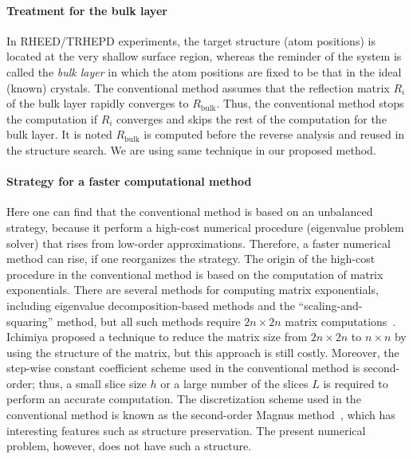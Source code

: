 \documentclass[preprint, 5p, times, sort&compress]{elsarticle}
\begin{document}
        \paragraph{Treatment for the bulk layer}
        In RHEED/TRHEPD experiments, the target structure (atom positions) is located at the very shallow surface region, whereas
        the reminder of the system is called the \emph{bulk layer} in which the atom positions are fixed to be that in the ideal (known) crystals.
        The conventional method assumes that the reflection matrix $R_i$ of the bulk layer rapidly converges to $R_\mathrm{bulk}$.
        Thus, the conventional method stops the computation if $R_i$ converges
        and skips the rest of the computation for the bulk layer. It is noted $R_\mathrm{bulk}$ is computed before the reverse analysis and reused in the structure search.
        We are using same technique in our proposed method.

        \paragraph{Strategy for a faster computational method}
        Here one can find that the conventional method is based on an unbalanced strategy, because it perform a high-cost numerical procedure (eigenvalue problem solver) that rises from  
        low-order approximations. Therefore, a faster numerical method can rise, if one reorganizes the strategy. 
        The origin of the high-cost procedure in the conventional method is based on the computation of matrix exponentials.  
        There are several methods for computing matrix exponentials, including eigenvalue decomposition-based methods
        and the ``scaling-and-squaring'' method, but all such methods require $2n\times 2n$ matrix computations~\cite{Moler2003}.
        Ichimiya proposed a technique to reduce the matrix size
        from $2n\times 2n$ to $n\times n$ by using the structure of the matrix,
        but this approach is still costly.
        Moreover, the step-wise constant coefficient scheme used in the conventional method is
        second-order; thus, a small slice size $h$ or a large number of the slices $L$ is required to perform an accurate computation.
        The discretization scheme used in the conventional method is known as
        the second-order Magnus method~\cite{Blanes2008},
        which has interesting features such as structure preservation.
        The present numerical problem, however, does not have such a structure. 
\end{document}
